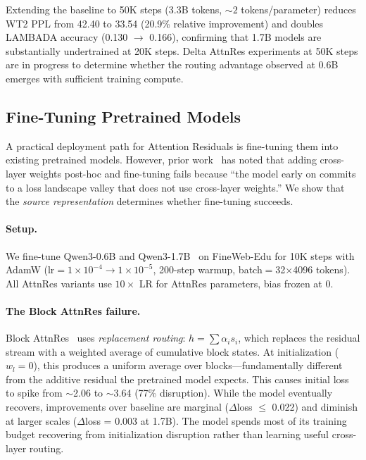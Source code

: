 \documentclass{article}
\begin{document}
Extending the baseline to 50K steps (3.3B tokens, ${\sim}2$ tokens/parameter) reduces WT2 PPL from 42.40 to 33.54 (20.9\% relative improvement) and doubles LAMBADA accuracy (0.130 $\to$ 0.166), confirming that 1.7B models are substantially undertrained at 20K steps. Delta AttnRes experiments at 50K steps are in progress to determine whether the routing advantage observed at 0.6B emerges with sufficient training compute.

\subsection{Fine-Tuning Pretrained Models}
\label{sec:finetune}

A practical deployment path for Attention Residuals is fine-tuning them into existing pretrained models. However, prior work~\citep{pagliardini2024denseformer} has noted that adding cross-layer weights post-hoc and fine-tuning fails because ``the model early on commits to a loss landscape valley that does not use cross-layer weights.'' We show that the \emph{source representation} determines whether fine-tuning succeeds.

\paragraph{Setup.} We fine-tune Qwen3-0.6B and Qwen3-1.7B~\citep{qwen2025qwen3} on FineWeb-Edu for 10K steps with AdamW (lr$=1{\times}10^{-4} \to 1{\times}10^{-5}$, 200-step warmup, batch$=$32$\times$4096 tokens). All AttnRes variants use $10{\times}$ LR for AttnRes parameters, bias frozen at 0.

\paragraph{The Block AttnRes failure.} Block AttnRes~\citep{kimi2025attention} uses \emph{replacement routing}: $h = \sum \alpha_i s_i$, which replaces the residual stream with a weighted average of cumulative block states. At initialization ($w_l = 0$), this produces a uniform average over blocks---fundamentally different from the additive residual the pretrained model expects. This causes initial loss to spike from $\sim$2.06 to $\sim$3.64 (77\% disruption). While the model eventually recovers, improvements over baseline are marginal ($\Delta$loss $\leq$ 0.022) and diminish at larger scales ($\Delta$loss = 0.003 at 1.7B). The model spends most of its training budget recovering from initialization disruption rather than learning useful cross-layer routing.
\end{document}
